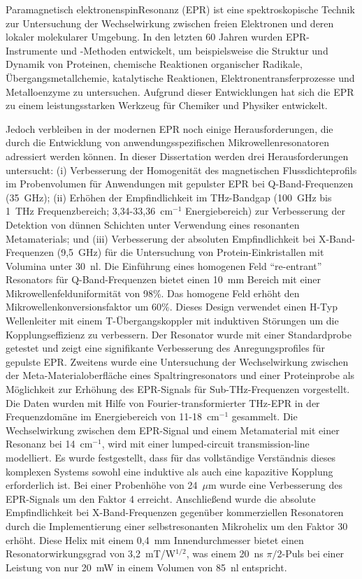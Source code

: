 \vspace{-2em}
Paramagnetisch elektronenspinResonanz (EPR) ist eine spektroskopische Technik zur Untersuchung der Wechselwirkung zwischen freien Elektronen und deren lokaler molekularer Umgebung. In den letzten 60 Jahren wurden EPR-Instrumente und -Methoden entwickelt, um beispielsweise die Struktur und Dynamik von Proteinen, chemische Reaktionen organischer Radikale, Übergangsmetallchemie, katalytische Reaktionen, Elektronentransferprozesse und Metalloenzyme zu untersuchen. Aufgrund dieser Entwicklungen hat sich die EPR zu einem leistungsstarken Werkzeug für Chemiker und Physiker entwickelt.

Jedoch verbleiben in der modernen EPR noch einige Herausforderungen, die durch die Entwicklung von anwendungsspezifischen Mikrowellenresonatoren adressiert werden können. In dieser Dissertation werden drei Herausforderungen untersucht: (i) Verbesserung der Homogenität des magnetischen Flussdichteprofils im Probenvolumen für Anwendungen mit gepulster EPR bei Q-Band-Frequenzen (35~GHz); (ii) Erhöhen der Empfindlichkeit im THz-Bandgap (100~GHz bis 1~THz Frequenzbereich; 3{,}34-33{,}36~cm$^{-1}$ Energiebereich) zur Verbesserung der Detektion von dünnen Schichten unter Verwendung eines resonanten Metamaterials; und (iii) Verbesserung der absoluten Empfindlichkeit bei X-Band-Frequenzen (9{,}5~GHz) für die Untersuchung von Protein-Einkristallen mit Volumina unter 30~nl. Die Einführung eines homogenen Feld ``re-entrant'' \cylTE{} Resonators für Q-Band-Frequenzen bietet einen 10~mm Bereich mit einer Mikrowellenfelduniformität von 98\%. Das homogene Feld erhöht den Mikrowellenkonversionsfaktor um 60\%. Dieses Design verwendet einen H-Typ Wellenleiter mit einem T-Übergangskoppler mit induktiven St\"{o}rungen um die Kopplungseffizienz zu verbessern. Der Resonator wurde mit einer Standardprobe getestet und zeigt eine signifikante Verbesserung des Anregungsprofiles für gepulste EPR. Zweitens wurde eine Untersuchung der Wechselwirkung zwischen der Meta-Materialoberfläche eines Spaltringresonators und einer Proteinprobe als Möglichkeit zur Erhöhung des EPR-Signals für Sub-THz-Frequenzen vorgestellt. Die Daten wurden mit Hilfe von Fourier-transformierter THz-EPR in der Frequenzdomäne im Energiebereich von 11-18~cm$^{-1}$ gesammelt.  Die Wechselwirkung zwischen dem EPR-Signal und einem Metamaterial mit einer Resonanz bei 14~cm$^{-1}$, wird mit einer lumped-circuit transmission-line modelliert. Es wurde festgestellt, dass für das vollständige Verständnis dieses komplexen Systems sowohl eine induktive als auch eine kapazitive Kopplung erforderlich ist. Bei einer Probenhöhe von 24~$\mu$m wurde eine Verbesserung des EPR-Signals um den Faktor 4 erreicht. Anschließend wurde die absolute Empfindlichkeit bei X-Band-Frequenzen gegenüber kommerziellen Resonatoren durch die Implementierung einer selbstresonanten Mikrohelix um den Faktor 30 erhöht. Diese Helix mit einem 0{,}4~mm Innendurchmesser bietet einen Resonatorwirkungsgrad von 3{,}2~mT/W$^{1/2}$, was einem 20~ns $\pi/2$-Puls bei einer Leistung von nur 20~mW in einem Volumen von 85~nl entspricht. %
